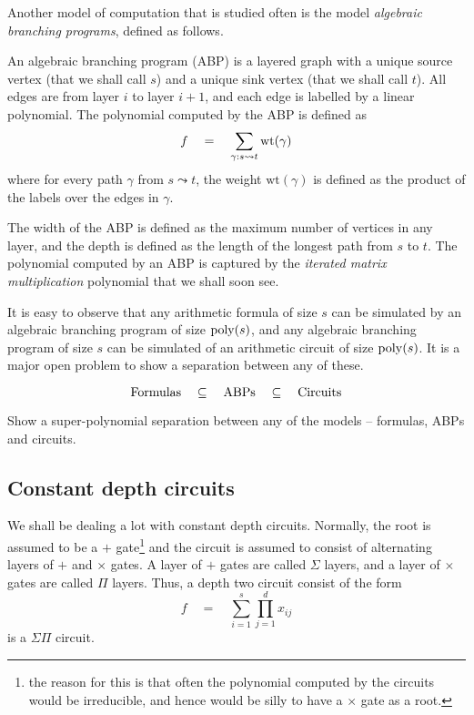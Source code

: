 Another model of computation that is studied often is the model \emph{algebraic branching programs}, defined as follows. 

\begin{definition}\label{defn:ABP}
An algebraic branching program (ABP) is a layered graph with a unique source vertex (that we shall call $s$) and a unique sink vertex (that we shall call $t$). 
All edges are from layer $i$ to layer $i+1$, and each edge is labelled by a linear polynomial. 
The polynomial computed by the ABP is defined as 
\[
f\quad = \quad \sum_{\gamma: s \leadsto t} \mathrm{wt}(\gamma)
\]
where for every path $\gamma$ from $s\leadsto t$, the weight $\mathrm{wt}(\gamma)$ is defined as the product of the labels over the edges in $\gamma$. 
\end{definition}

The width of the ABP is defined as the maximum number of vertices in any layer, and the depth is defined as the length of the longest path from $s$ to $t$. 
The polynomial computed by an ABP is captured by the \emph{iterated matrix multiplication} polynomial that we shall soon see. 

It is easy to observe that any arithmetic formula of size $s$ can be simulated by an algebraic branching program of size $\mathrm{poly}(s)$, and any algebraic branching program of size $s$ can be simulated of an arithmetic circuit of size $\mathrm{poly}(s)$. 
It is a major open problem to show a separation between any of these. 

\[
\mathrm{Formulas} \quad \subseteq \quad \mathrm{ABPs} \quad \subseteq \quad \mathrm{Circuits}
\]

\begin{openproblem}
Show a super-polynomial separation between any of the models -- formulas, ABPs and circuits. 
\end{openproblem}

\subsection{Constant depth circuits}

We shall be dealing a lot with constant depth circuits. 
Normally, the root is assumed to be a $+$ gate\footnote{the reason for this is that often the polynomial computed by the circuits would be irreducible, and hence would be silly to have a $\times$ gate as a root.} and the circuit is assumed to consist of alternating layers of $+$ and $\times$ gates. 
A layer of $+$ gates are called $\Sigma$ layers, and a layer of $\times$ gates are called $\Pi$ layers. 
Thus, a depth two circuit consist of the form 
\[
f\quad = \quad \sum_{i=1}^s \prod_{j=1}^d x_{ij}
\]
is a $\Sigma\Pi$ circuit. 

